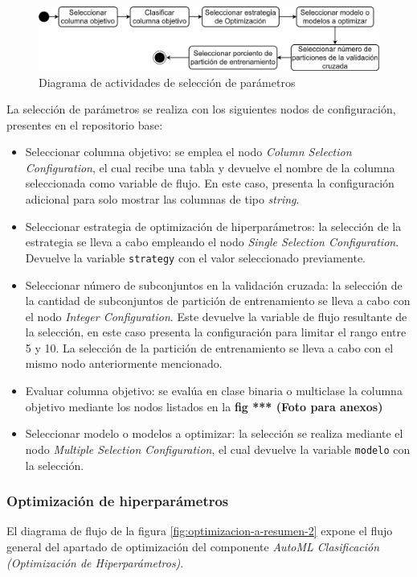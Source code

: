 \begin{figure}[H]
	\centering
	\includegraphics[width=0.7\linewidth]{"figuras/capi 2/hpo/diagrama-act-selecc-param-hpo"}
	\caption[Diagrama de actividades de selección de parámetros]{Diagrama de actividades de selección de parámetros}
	\label{fig:diagrama-act-selecc-param-hpo}
\end{figure}

La selección de parámetros se realiza con los siguientes nodos de configuración, presentes en el repositorio base:

\begin{itemize}
	\item Seleccionar columna objetivo: se emplea el nodo \textit{Column Selection Configuration}, el cual recibe una tabla y devuelve el nombre de la columna seleccionada como variable de flujo. En este caso, presenta la configuración adicional para solo mostrar las columnas de tipo \textit{string}.
	\item Seleccionar estrategia de optimización de hiperparámetros: la selección de la estrategia se lleva a cabo empleando el nodo \textit{Single Selection Configuration}. Devuelve la variable \texttt{strategy} con el valor seleccionado previamente.
	\item Seleccionar número de subconjuntos en la validación cruzada: la selección de la cantidad de subconjuntos de partición de entrenamiento se lleva a cabo con el nodo \textit{Integer Configuration}. Este devuelve la variable de flujo resultante de la selección, en este caso presenta la configuración para limitar el rango entre 5 y 10.  La selección de la partición de entrenamiento se lleva a cabo con el mismo nodo anteriormente mencionado.
	\item Evaluar columna objetivo: se evalúa en clase binaria o multiclase la columna objetivo mediante los nodos listados en la \textbf{fig *** (Foto para anexos) }
	\item Seleccionar modelo o modelos a optimizar: la selección se realiza mediante el nodo \textit{Multiple Selection Configuration}, el cual devuelve la variable \texttt{modelo} con la selección.
\end{itemize}

\subsubsection*{Optimización de hiperparámetros}
El diagrama de flujo de la figura \ref{fig:optimizacion-a-resumen-2} expone el flujo general del apartado de optimización del componente \textit{AutoML Clasificación (Optimización de Hiperparámetros)}.

